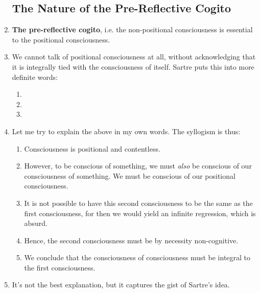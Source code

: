 \begin{enumerate}
  \subsection{The Nature of the Pre-Reflective Cogito}
  \item \textbf{The pre-reflective cogito}, i.e. the non-positional consciousness is essential to the positional consciousness.
  \item We cannot talk of positional consciousness at all, without acknowledging that it is integrally tied with the consciousness of itself. Sartre puts this into more definite words:
  \begin{enumerate}
    \item {}
    \item {}
    \item {}
  \end{enumerate}
  \item Let me try to explain the above in my own words. The syllogism is thus:
  \begin{enumerate}
    \item Consciousness is positional and contentless.
    \item However, to be conscious of something, we must \emph{also} be conscious of our consciousness of something. We must be conscious of our positional consciousness.
    \item It is not possible to have this second consciousness to be the same as the first consciousness, for then we would yield an infinite regression, which is absurd.
    \item Hence, the second consciousness must be by necessity non-cognitive.
    \item We conclude that the consciousness of consciousness must be integral to the first consciousness.
  \end{enumerate}
  \item It's not the best explanation, but it captures the gist of Sartre's idea.


\end{enumerate}
